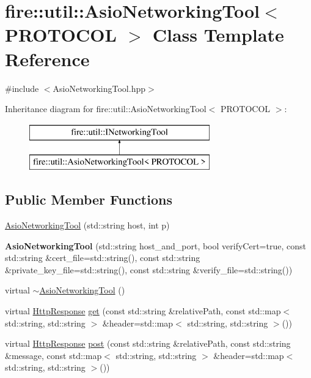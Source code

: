 \hypertarget{a01601}{}\section{fire\+:\+:util\+:\+:Asio\+Networking\+Tool$<$ P\+R\+O\+T\+O\+C\+OL $>$ Class Template Reference}
\label{a01601}


{\ttfamily \#include $<$Asio\+Networking\+Tool.\+hpp$>$}

Inheritance diagram for fire\+:\+:util\+:\+:Asio\+Networking\+Tool$<$ P\+R\+O\+T\+O\+C\+OL $>$\+:\begin{figure}[H]
\begin{center}
\leavevmode
\includegraphics[height=2.000000cm]{a01601}
\end{center}
\end{figure}
\subsection*{Public Member Functions}
\begin{DoxyCompactItemize}
\item 
\hyperlink{a01601_a5edd72ce9937e052a82e7564500b3861}{Asio\+Networking\+Tool} (std\+::string host, int p)
\item 
\mbox{\label{a01601_a5826de4a9e051ec854ad7be3a48ac86d}} 
{\bfseries Asio\+Networking\+Tool} (std\+::string host\+\_\+and\+\_\+port, bool verify\+Cert=true, const std\+::string \&cert\+\_\+file=std\+::string(), const std\+::string \&private\+\_\+key\+\_\+file=std\+::string(), const std\+::string \&verify\+\_\+file=std\+::string())
\item 
virtual \hyperlink{a01601_afc51c728e1bd136b6729ac892df490ab}{$\sim$\+Asio\+Networking\+Tool} ()
\item 
virtual \hyperlink{a01605}{Http\+Response} \hyperlink{a01601_a42609f768f245acf0867889e920c5d49}{get} (const std\+::string \&relative\+Path, const std\+::map$<$ std\+::string, std\+::string $>$ \&header=std\+::map$<$ std\+::string, std\+::string $>$())
\item 
virtual \hyperlink{a01605}{Http\+Response} \hyperlink{a01601_a2ac524ceef89fceb928cf74420bf90a5}{post} (const std\+::string \&relative\+Path, const std\+::string \&message, const std\+::map$<$ std\+::string, std\+::string $>$ \&header=std\+::map$<$ std\+::string, std\+::string $>$())
\end{DoxyCompactItemize}
